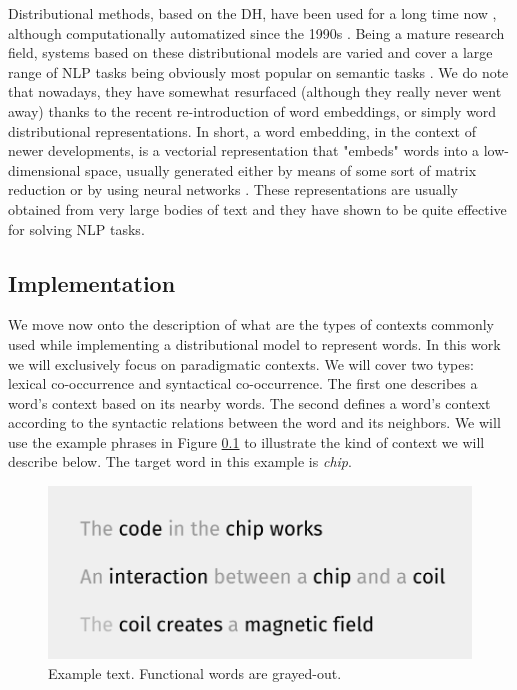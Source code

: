 Distributional methods, based on the DH, have been used for a long time now \cite{JurafskyM09}, although computationally automatized since the 1990s \cite{perinet2015}. Being a mature research field, systems based on these distributional models are varied and cover a large range of NLP tasks being obviously most popular on semantic tasks \cite{baroni2010distributional}. We do note that nowadays, they have somewhat resurfaced (although they really never went away) thanks to the recent re-introduction of word embeddings, or simply word distributional representations. In short, a word embedding, in the context of newer developments, is a vectorial representation  that "embeds" words into a low-dimensional space, usually generated either by means of some sort of matrix reduction \cite{lebret2013deep,levy2014neural} or by using neural networks \cite{Collobert2011,mikolov2013distributed}. These representations are usually obtained from very large bodies of text and they have shown to be quite effective for solving NLP tasks.

\subsection{Implementation}
We move now onto the description of what are the types of contexts commonly used while implementing a distributional model to represent words. In this work we will exclusively focus on paradigmatic contexts. We will cover two types: lexical co-occurrence and syntactical co-occurrence. The first one describes a word's context based on its nearby words.  The second defines a word's context according to the syntactic relations between the word and its neighbors. We will use the example phrases in Figure \ref{} to illustrate the kind of context we will describe below. The target word in this example is \textit{chip}.
\begin{figure}
\centering
\includegraphics[width=0.7\linewidth]{images/Chapitre2/example_phrases.pdf}
\caption{Example text. Functional words are grayed-out. }
\label{fig:example_phrases}
\end{figure}



